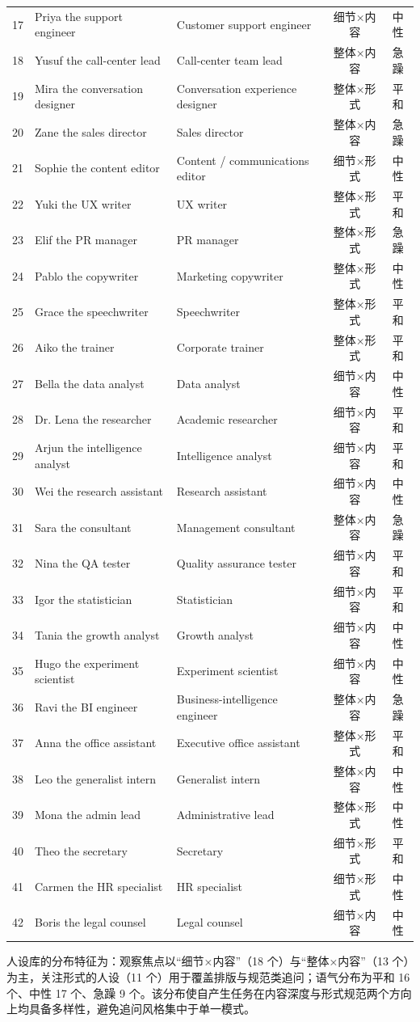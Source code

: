 \begin{longtable}{clp{4.2cm}cc}
        17 & Priya the support engineer & Customer support engineer & 细节×内容 & 中性 \\
        18 & Yusuf the call-center lead & Call-center team lead & 整体×内容 & 急躁 \\
        19 & Mira the conversation designer & Conversation experience designer & 整体×形式 & 平和 \\
        20 & Zane the sales director & Sales director & 整体×内容 & 急躁 \\
        21 & Sophie the content editor & Content / communications editor & 细节×形式 & 中性 \\
        22 & Yuki the UX writer & UX writer & 整体×形式 & 平和 \\
        23 & Elif the PR manager & PR manager & 整体×形式 & 急躁 \\
        24 & Pablo the copywriter & Marketing copywriter & 整体×形式 & 中性 \\
        25 & Grace the speechwriter & Speechwriter & 整体×形式 & 平和 \\
        26 & Aiko the trainer & Corporate trainer & 整体×形式 & 平和 \\
        27 & Bella the data analyst & Data analyst & 细节×内容 & 中性 \\
        28 & Dr. Lena the researcher & Academic researcher & 细节×内容 & 平和 \\
        29 & Arjun the intelligence analyst & Intelligence analyst & 细节×内容 & 平和 \\
        30 & Wei the research assistant & Research assistant & 细节×内容 & 中性 \\
        31 & Sara the consultant & Management consultant & 整体×内容 & 急躁 \\
        32 & Nina the QA tester & Quality assurance tester & 细节×内容 & 平和 \\
        33 & Igor the statistician & Statistician & 细节×内容 & 平和 \\
        34 & Tania the growth analyst & Growth analyst & 细节×内容 & 中性 \\
        35 & Hugo the experiment scientist & Experiment scientist & 细节×内容 & 中性 \\
        36 & Ravi the BI engineer & Business-intelligence engineer & 整体×内容 & 急躁 \\
        37 & Anna the office assistant & Executive office assistant & 整体×形式 & 平和 \\
        38 & Leo the generalist intern & Generalist intern & 整体×内容 & 中性 \\
        39 & Mona the admin lead & Administrative lead & 整体×形式 & 中性 \\
        40 & Theo the secretary & Secretary & 细节×形式 & 平和 \\
        41 & Carmen the HR specialist & HR specialist & 细节×形式 & 中性 \\
        42 & Boris the legal counsel & Legal counsel & 细节×内容 & 中性 \\
\end{longtable}

人设库的分布特征为：观察焦点以“细节×内容”（18 个）与“整体×内容”（13 个）为主，关注形式的人设（11 个）用于覆盖排版与规范类追问；语气分布为平和 16 个、中性 17 个、急躁 9 个。该分布使自产生任务在内容深度与形式规范两个方向上均具备多样性，避免追问风格集中于单一模式。
